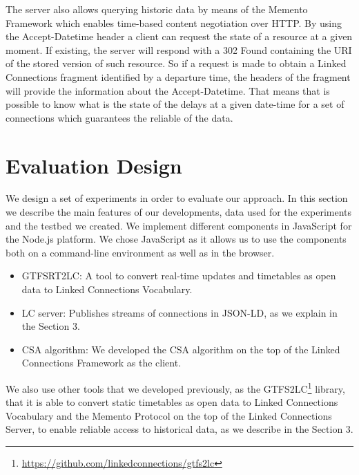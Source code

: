 \documentclass[sw]{iosart2x}
\begin{document}
The server also allows querying historic data by means of the Memento Framework\cite{van2010http} which enables time-based content negotiation over HTTP. By using the Accept-Datetime header a client can request the state of a resource at a given moment. If existing, the server will respond with a 302 Found containing the URI of the stored version of such resource. So if a request is made to obtain a Linked Connections fragment identified by a departure time, the headers of the fragment will provide the information about the Accept-Datetime. That means that is possible to know what is the state of the delays at a given date-time for a set of connections which guarantees the reliable of the data.


\section{Evaluation Design}

We design a set of experiments in order to evaluate our approach. In this section we describe the main features of our developments, data used for the experiments and the testbed we created.
We implement different components in JavaScript for the Node.js platform. We chose JavaScript as it allows us to use the components both on a command-line environment as well as in the browser.
\begin{itemize}
\item GTFSRT2LC: A tool to convert real-time updates and timetables as open data to Linked Connections Vocabulary.
\item LC server: Publishes streams of connections in JSON-LD, as we explain in the Section 3.
\item CSA algorithm: We developed the CSA algorithm on the top of the Linked Connections Framework as the client.
\end{itemize}

We also use other tools that we developed previously, as the GTFS2LC\footnote{\url{https://github.com/linkedconnections/gtfs2lc}} library, that it is able to convert static timetables as open data to Linked Connections Vocabulary and the Memento Protocol on the top of the Linked Connections Server\cite{rojas2017providing}, to enable reliable access to historical data, as we describe in the Section 3.
\end{document}
